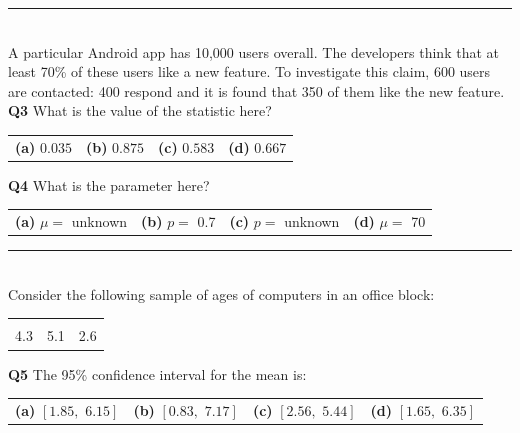 \documentclass[12pt]{article}
\begin{document}
%


\rule{\linewidth}{1pt}
\quad\\
A particular Android app has 10,000 users overall. The developers think that at least 70\% of these users like a new feature. To investigate this claim, 600 users are contacted: 400 \mbox{respond} and it is found that 350 of them like the new feature.
\\[0.2cm]

{\bf Q3} What is the value of the statistic here?\\[0.2cm]
\begin{tabular}{cccc}
{\bf(a)} $0.035$  & {\bf(b)} $0.875$ & {\bf(c)} $0.583$ & {\bf(d)} $0.667$ \\[0.6cm]
\end{tabular}

{\bf Q4} What is the parameter here? \\[0.2cm]
\begin{tabular}{cccc}
{\bf(a)} $\mu=$ unknown & {\bf(b)}  $p=$ 0.7 & {\bf(c)} $p=$ unknown & {\bf(d)} $\mu=$ 70 \\[0.6cm]
\end{tabular}



\rule{\linewidth}{1pt}

\quad\\
Consider the following sample of ages of computers in an office block:
\begin{center}
\begin{tabular}{|ccc|}
\hline
&&\\[-0.3cm]
4.3 & 5.1 & 2.6 \\[0.1cm]
\hline
\end{tabular}
\end{center}
{\bf Q5} The 95\% confidence interval for the mean is:\\[0.2cm]
\begin{tabular}{cccc}
{\bf(a)} $[1.85,\,\,6.15]$ & {\bf(b)} $[0.83,\,\,7.17]$ & {\bf(c)} $[2.56,\,\,5.44]$ & {\bf(d)} $[1.65,\,\,6.35]$ \\[0.6cm]
\end{tabular}
\end{document}
